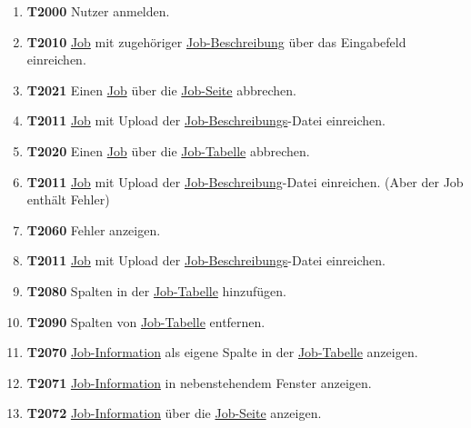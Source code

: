 \begin{enumerate}

    \item \textbf{T2000} \gls{Nutzer} anmelden.
        
    \item \textbf{T2010} \hyperref[B:Jobs]{Job} mit zugehöriger \hyperref[B:Job-Beschreibung]{Job-Beschreibung} über das Eingabefeld einreichen.
    
    \item \textbf{T2021} Einen \hyperref[B:Jobs]{Job} über die \hyperref[pages:job-page]{Job-Seite} abbrechen.
    
    \item \textbf{T2011}  \hyperref[B:Jobs]{Job} mit Upload der \hyperref[B:Job-Beschreibung]{Job-Beschreibungs}-Datei einreichen. 
    
    \item \textbf{T2020} Einen  \hyperref[B:Jobs]{Job} über die \hyperref[pages:job-table]{Job-Tabelle} abbrechen. 
    
    \item \textbf{T2011}  \hyperref[B:Jobs]{Job} mit Upload der \hyperref[B:Job-Beschreibung]{Job-Beschreibung}-Datei einreichen. (Aber der Job enthält Fehler)
    
    \item \textbf{T2060} Fehler anzeigen.
    
    \item \textbf{T2011}  \hyperref[B:Jobs]{Job} mit Upload der \hyperref[B:Job-Beschreibung]{Job-Beschreibungs}-Datei einreichen.

    \item \textbf{T2080} Spalten in der \hyperref[pages:job-table]{Job-Tabelle} hinzufügen.
    
    \item \textbf{T2090} Spalten von \hyperref[pages:job-table]{Job-Tabelle} entfernen.
    
    \item \textbf{T2070} \hyperref[B:Job-Informationen]{Job-Information} als eigene Spalte in der \hyperref[pages:job-table]{Job-Tabelle} anzeigen.
        
    \item \textbf{T2071} \hyperref[B:Job-Informationen]{Job-Information} in nebenstehendem Fenster anzeigen.
         
    \item \textbf{T2072} \hyperref[B:Job-Informationen]{Job-Information} über die \hyperref[pages:job-page]{Job-Seite} anzeigen. 
    

\end{enumerate}
